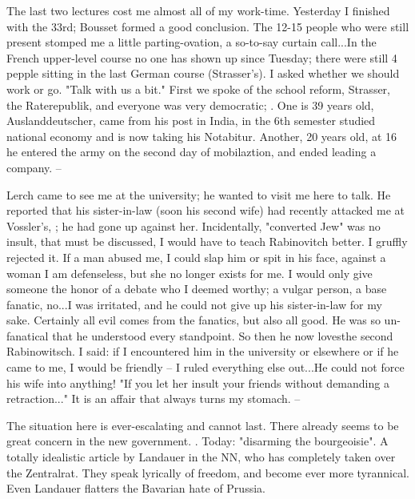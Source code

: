 
The last two lectures cost me almost all of my work-time. Yesterday I finished with the 33rd; Bousset formed a good conclusion. The 12-15 people who were still present stomped me a little parting-ovation, a so-to-say curtain call...In the French upper-level course no one has shown up since Tuesday; there were still 4 pepple sitting in the last German course (Strasser's). I asked whether we should work or go. "Talk with us a bit." First we spoke of the school reform, Strasser, the Raterepublik, and everyone was very democratic; . One is 39 years old, Auslanddeutscher, came from his post in India, in the 6th semester studied national economy and is now taking his Notabitur. Another, 20 years old, at 16 he entered the army on the second day of mobilaztion, and ended leading a company. --

Lerch came to see me at the university; he wanted to visit me here to talk. He reported that his sister-in-law (soon his second wife) had recently attacked me at Vossler's, ; he had gone up against her. Incidentally, "converted Jew" was no insult, that must be discussed, I would have to teach Rabinovitch better. I gruffly rejected it. If a man abused me, I could slap him or spit in his face, against a woman I am defenseless, but she no longer exists for me. I would only give someone the honor of a debate who I deemed worthy; a vulgar person, a base fanatic, no...I was irritated, and he could not give up his sister-in-law for my sake. Certainly all evil comes from the fanatics, but also all good. He was so un-fanatical that he understood every standpoint. So then he now lovesthe second Rabinowitsch. I said: if I encountered him in the university or elsewhere or if he came to me, I would be friendly -- I ruled everything else out...He could not force his wife into anything! "If you let her insult your friends without demanding a retraction..." It is an affair that always turns my stomach. --

The situation here is ever-escalating and cannot last. There already seems to be great concern in the new government. . Today: "disarming the bourgeoisie". A totally idealistic article by Landauer in the NN, who has completely taken over the Zentralrat. They speak lyrically of freedom, and become ever more tyrannical. Even Landauer flatters the Bavarian hate of Prussia.

